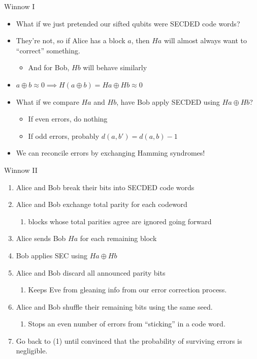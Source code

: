 \documentclass[pdf]{beamer}
\begin{document}
\begin{frame}{Winnow I}
  \begin{itemize}
  \item What if we just pretended our sifted qubits were SECDED code words?
  \pause\item They're not, so if Alice has a block $a$, then $Ha$ will almost always
    want to ``correct'' something.
    \begin{itemize}
    \item And for Bob, $Hb$ will behave similarly
    \end{itemize}
  \pause\item $a \oplus b \approx 0 \implies H(a \oplus b) = Ha \oplus Hb \approx 0$
  \pause\item What if we compare $Ha$ and $Hb$, have Bob apply SECDED using
    $Ha \oplus Hb$?
    \begin{itemize}
    \item If even errors, do nothing
    \item If odd errors, probably $d(a, b') = d(a, b) - 1$
    \end{itemize}
  \pause\item We can reconcile errors by exchanging Hamming syndromes!
  \end{itemize}
\end{frame}
\begin{frame}{Winnow II}
  \begin{enumerate}
  \item Alice and Bob break their bits into SECDED code words
  \pause\item Alice and Bob exchange total parity for each codeword
    \begin{enumerate}
    \item blocks whose total parities agree are ignored going forward
    \end{enumerate}
  \pause\item Alice sends Bob $Ha$ for each remaining block
  \pause\item Bob applies SEC using $Ha \oplus Hb$
  \pause\item Alice and Bob discard all announced parity bits
    \begin{enumerate}
    \item Keeps Eve from gleaning info from our error correction process.
    \end{enumerate}
  \pause\item Alice and Bob shuffle their remaining bits using the same seed.
    \begin{enumerate}
    \item Stops an even number of errors from ``sticking'' in a code word.
    \end{enumerate}
  \pause\item Go back to (1) until convinced that the probability of surviving errors
    is negligible.
  \end{enumerate}
\end{frame}
\end{document}

